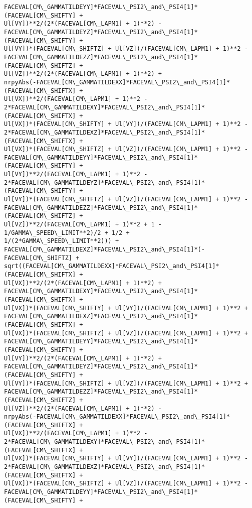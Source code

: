 \documentclass[landscape,letterpaper,10pt,english]{article}
\begin{document}
\begin{Verbatim}[commandchars=\\\{\}]
FACEVAL[CM\_GAMMATILDEYY]*FACEVAL\_PSI2\_and\_PSI4[1]*(FACEVAL[CM\_SHIFTY] +
Ul[VY])**2/(2*(FACEVAL[CM\_LAPM1] + 1)**2) -
FACEVAL[CM\_GAMMATILDEYZ]*FACEVAL\_PSI2\_and\_PSI4[1]*(FACEVAL[CM\_SHIFTY] +
Ul[VY])*(FACEVAL[CM\_SHIFTZ] + Ul[VZ])/(FACEVAL[CM\_LAPM1] + 1)**2 -
FACEVAL[CM\_GAMMATILDEZZ]*FACEVAL\_PSI2\_and\_PSI4[1]*(FACEVAL[CM\_SHIFTZ] +
Ul[VZ])**2/(2*(FACEVAL[CM\_LAPM1] + 1)**2) +
nrpyAbs(-FACEVAL[CM\_GAMMATILDEXX]*FACEVAL\_PSI2\_and\_PSI4[1]*(FACEVAL[CM\_SHIFTX] +
Ul[VX])**2/(FACEVAL[CM\_LAPM1] + 1)**2 -
2*FACEVAL[CM\_GAMMATILDEXY]*FACEVAL\_PSI2\_and\_PSI4[1]*(FACEVAL[CM\_SHIFTX] +
Ul[VX])*(FACEVAL[CM\_SHIFTY] + Ul[VY])/(FACEVAL[CM\_LAPM1] + 1)**2 -
2*FACEVAL[CM\_GAMMATILDEXZ]*FACEVAL\_PSI2\_and\_PSI4[1]*(FACEVAL[CM\_SHIFTX] +
Ul[VX])*(FACEVAL[CM\_SHIFTZ] + Ul[VZ])/(FACEVAL[CM\_LAPM1] + 1)**2 -
FACEVAL[CM\_GAMMATILDEYY]*FACEVAL\_PSI2\_and\_PSI4[1]*(FACEVAL[CM\_SHIFTY] +
Ul[VY])**2/(FACEVAL[CM\_LAPM1] + 1)**2 -
2*FACEVAL[CM\_GAMMATILDEYZ]*FACEVAL\_PSI2\_and\_PSI4[1]*(FACEVAL[CM\_SHIFTY] +
Ul[VY])*(FACEVAL[CM\_SHIFTZ] + Ul[VZ])/(FACEVAL[CM\_LAPM1] + 1)**2 -
FACEVAL[CM\_GAMMATILDEZZ]*FACEVAL\_PSI2\_and\_PSI4[1]*(FACEVAL[CM\_SHIFTZ] +
Ul[VZ])**2/(FACEVAL[CM\_LAPM1] + 1)**2 + 1 - 1/GAMMA\_SPEED\_LIMIT**2)/2 + 1/2 +
1/(2*GAMMA\_SPEED\_LIMIT**2))) +
FACEVAL[CM\_GAMMATILDEXZ]*FACEVAL\_PSI2\_and\_PSI4[1]*(-FACEVAL[CM\_SHIFTZ] +
sqrt((FACEVAL[CM\_GAMMATILDEXX]*FACEVAL\_PSI2\_and\_PSI4[1]*(FACEVAL[CM\_SHIFTX] +
Ul[VX])**2/(2*(FACEVAL[CM\_LAPM1] + 1)**2) +
FACEVAL[CM\_GAMMATILDEXY]*FACEVAL\_PSI2\_and\_PSI4[1]*(FACEVAL[CM\_SHIFTX] +
Ul[VX])*(FACEVAL[CM\_SHIFTY] + Ul[VY])/(FACEVAL[CM\_LAPM1] + 1)**2 +
FACEVAL[CM\_GAMMATILDEXZ]*FACEVAL\_PSI2\_and\_PSI4[1]*(FACEVAL[CM\_SHIFTX] +
Ul[VX])*(FACEVAL[CM\_SHIFTZ] + Ul[VZ])/(FACEVAL[CM\_LAPM1] + 1)**2 +
FACEVAL[CM\_GAMMATILDEYY]*FACEVAL\_PSI2\_and\_PSI4[1]*(FACEVAL[CM\_SHIFTY] +
Ul[VY])**2/(2*(FACEVAL[CM\_LAPM1] + 1)**2) +
FACEVAL[CM\_GAMMATILDEYZ]*FACEVAL\_PSI2\_and\_PSI4[1]*(FACEVAL[CM\_SHIFTY] +
Ul[VY])*(FACEVAL[CM\_SHIFTZ] + Ul[VZ])/(FACEVAL[CM\_LAPM1] + 1)**2 +
FACEVAL[CM\_GAMMATILDEZZ]*FACEVAL\_PSI2\_and\_PSI4[1]*(FACEVAL[CM\_SHIFTZ] +
Ul[VZ])**2/(2*(FACEVAL[CM\_LAPM1] + 1)**2) -
nrpyAbs(-FACEVAL[CM\_GAMMATILDEXX]*FACEVAL\_PSI2\_and\_PSI4[1]*(FACEVAL[CM\_SHIFTX] +
Ul[VX])**2/(FACEVAL[CM\_LAPM1] + 1)**2 -
2*FACEVAL[CM\_GAMMATILDEXY]*FACEVAL\_PSI2\_and\_PSI4[1]*(FACEVAL[CM\_SHIFTX] +
Ul[VX])*(FACEVAL[CM\_SHIFTY] + Ul[VY])/(FACEVAL[CM\_LAPM1] + 1)**2 -
2*FACEVAL[CM\_GAMMATILDEXZ]*FACEVAL\_PSI2\_and\_PSI4[1]*(FACEVAL[CM\_SHIFTX] +
Ul[VX])*(FACEVAL[CM\_SHIFTZ] + Ul[VZ])/(FACEVAL[CM\_LAPM1] + 1)**2 -
FACEVAL[CM\_GAMMATILDEYY]*FACEVAL\_PSI2\_and\_PSI4[1]*(FACEVAL[CM\_SHIFTY] +

\end{Verbatim}
\end{document}
